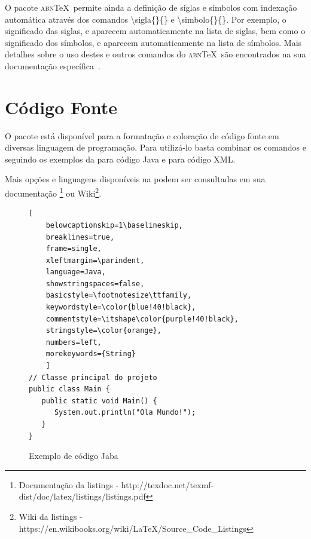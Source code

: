 O pacote \textsc{abn}\TeX\ permite ainda a defini\c{c}\~ao de siglas e s\'imbolos com indexa\c{c}\~ao autom\'atica atrav\'es dos comandos {\ttfamily \textbackslash sigla\{\}\{\}} e {\ttfamily \textbackslash simbolo\{\}\{\}}. Por exemplo, o significado das siglas, e aparecem automaticamente na lista de siglas, bem como o significado dos s\'imbolos, e aparecem automaticamente na lista de s\'imbolos. Mais detalhes sobre o uso destes e outros comandos do \textsc{abn}\TeX\ s\~ao encontrados na sua documenta\c{c}\~ao espec\'ifica~\cite{abnTeX2009}.

\section{Código Fonte}

O pacote  está disponível para a formatação e coloração de código fonte em diversas linguagem de programação.
Para utilizá-lo basta combinar os comandos  e  seguindo os exemplos da  para código Java e  para código XML.

Mais opções e linguagens disponíveis na  podem ser consultadas em sua documentação \footnote{Documentação da listings - http://texdoc.net/texmf-dist/doc/latex/listings/listings.pdf} ou Wiki\footnote{Wiki da listings - https://en.wikibooks.org/wiki/LaTeX/Source\_Code\_Listings}. 

\begin{figure}[!htb]
	\centering
	\caption{Exemplo de código Jaba}
	\label{fig:codigo_exemplo_java}
	
	\begin{lstlisting}[
	belowcaptionskip=1\baselineskip,
	breaklines=true,
	frame=single,
	xleftmargin=\parindent,
	language=Java,
	showstringspaces=false,
	basicstyle=\footnotesize\ttfamily,
	keywordstyle=\color{blue!40!black},
	commentstyle=\itshape\color{purple!40!black},
	stringstyle=\color{orange},
	numbers=left,
	morekeywords={String}
	]
// Classe principal do projeto
public class Main {
   public static void Main() {
      System.out.println("Ola Mundo!");
   }
}
	\end{lstlisting}
\end{figure}

